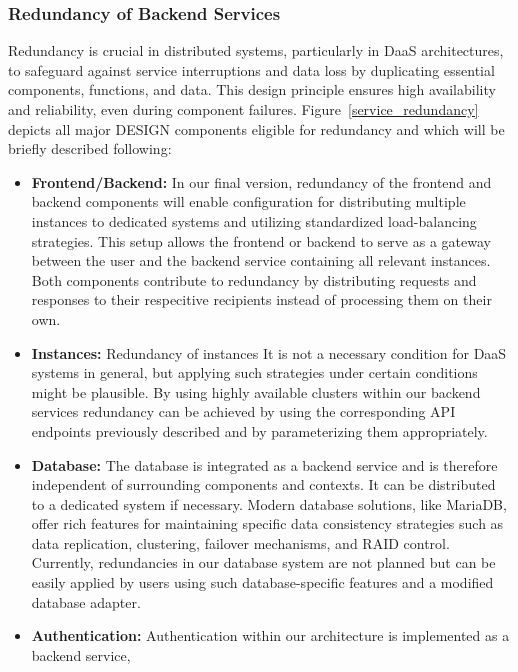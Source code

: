 \documentclass[runningheads]{llncs}
\begin{document}
\subsubsection{Redundancy of Backend Services}

Redundancy is crucial in distributed systems,
particularly in DaaS architectures,
to safeguard against service interruptions and data loss
by duplicating essential components, functions, and data.
This design principle ensures high availability and reliability,
even during component failures.
Figure~\ref{service_redundancy} depicts all major DESIGN components eligible for redundancy
and which will be briefly described following:
\begin{itemize}
	\item \textbf{Frontend/Backend:}
	      In our final version,
	      redundancy of the frontend and backend components
	      will enable configuration for distributing multiple instances
	      to dedicated systems and utilizing standardized load-balancing strategies.
	      This setup allows the frontend or backend
	      to serve as a gateway between the user and the backend service
	      containing all relevant instances.
	      Both components contribute to redundancy
	      by distributing requests and responses to their respecitive recipients
	      instead of processing them on their own.
	\item \textbf{Instances:} Redundancy of instances
	      It is not a necessary condition for DaaS systems in general,
	      but applying such strategies under certain conditions might be plausible.
	      By using highly available clusters within our backend services
	      redundancy can be achieved by using the corresponding API endpoints
	      previously described and by parameterizing them appropriately.
	\item \textbf{Database:}
	      The database is integrated as a backend service
	      and is therefore independent of surrounding components and contexts.
	      It can be distributed to a dedicated system if necessary.
	      Modern database solutions, like MariaDB,
	      offer rich features for maintaining specific data consistency strategies
	      such as data replication, clustering, failover mechanisms,
	      and RAID control.
	      Currently, redundancies in our database system are not planned
	      but can be easily applied by users using such database-specific features
	      and a modified database adapter.
	\item \textbf{Authentication: }
	      Authentication within our architecture is implemented as a backend service,

\end{itemize}
\end{document}

